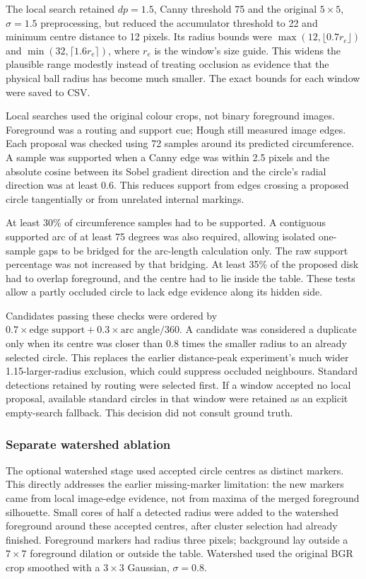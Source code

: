 The local search retained $dp=1.5$, Canny threshold 75 and the original
$5\times5$, $\sigma=1.5$ preprocessing, but reduced the accumulator
threshold to 22 and minimum centre distance to 12 pixels. Its radius
bounds were $\max(12,\lfloor0.7r_e\rfloor)$ and
$\min(32,\lceil1.6r_e\rceil)$, where $r_e$ is the window's size guide.
This widens the plausible range modestly instead of treating occlusion
as evidence that the physical ball radius has become much smaller.
The exact bounds for each window were saved to CSV.

Local searches used the original colour crops, not binary foreground
images. Foreground was a routing and support cue; Hough still measured
image edges. Each proposal was checked using 72 samples around its
predicted circumference. A sample was supported when a Canny edge was
within 2.5 pixels and the absolute cosine between its Sobel gradient
direction and the circle's radial direction was at least 0.6. This
reduces support from edges crossing a proposed circle tangentially or
from unrelated internal markings.

At least 30\% of circumference samples had to be supported. A contiguous
supported arc of at least 75 degrees was also required, allowing isolated
one-sample gaps to be bridged for the arc-length calculation only.
The raw support percentage was not increased by that bridging. At least
35\% of the proposed disk had to overlap foreground, and the centre
had to lie inside the table. These tests allow a partly occluded circle
to lack edge evidence along its hidden side.

Candidates passing these checks were ordered by
$0.7\times\text{edge support}+0.3\times\text{arc angle}/360$.
A candidate was considered a duplicate only when its centre was closer
than 0.8 times the smaller radius to an already selected circle.
This replaces the earlier distance-peak experiment's much wider
1.15-larger-radius exclusion, which could suppress occluded neighbours.
Standard detections retained by routing were selected first. If a
window accepted no local proposal, available standard circles in that
window were retained as an explicit empty-search fallback. This decision
did not consult ground truth.

\subsubsection{Separate watershed ablation}

The optional watershed stage used accepted circle centres as distinct
markers. This directly addresses the earlier missing-marker limitation:
the new markers came from local image-edge evidence, not from maxima
of the merged foreground silhouette. Small cores of half a detected
radius were added to the watershed foreground around these accepted
centres, after cluster selection had already finished. Foreground
markers had radius three pixels; background lay outside a $7\times7$
foreground dilation or outside the table. Watershed used the original
BGR crop smoothed with a $3\times3$ Gaussian, $\sigma=0.8$.

